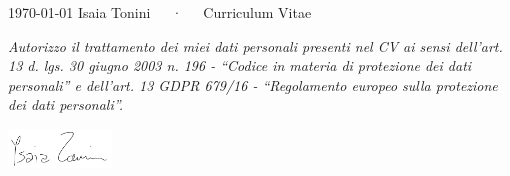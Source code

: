 \documentclass[11pt, a4paper]{awesome-cv}
\begin{document}
\makecvheader[C]

\makecvfooter
  {\today}
  {{Isaia Tonini}~~~·~~~Curriculum Vitae}
  {\thepage}









\newcommand{\datipersonali}{\footnotesize\color{gray}\itshape Autorizzo il trattamento dei miei dati personali presenti nel CV ai sensi dell’art. 13 d. lgs. 30 giugno 2003 n. 196 - “Codice in materia di protezione dei dati personali” e dell’art. 13 GDPR 679/16 - “Regolamento europeo sulla protezione dei dati personali”.}

\vfill %

\datipersonali\\[2ex]
\hfill
\begin{minipage}[b]{0.95\textwidth}
    \hspace*{\fill}
    \includegraphics[width=2.75cm]{firma-no-bg.png}
\end{minipage}
\end{document}
